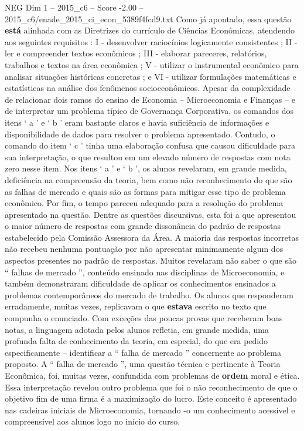 \begin{textsample}{NEG Dim 1 – 2015\_c6 – Score -2.00 – 2015\_c6/enade\_2015\_ci\_econ\_5389f4fcd9.txt}
Como já apontado, essa questão \textbf{está} alinhada com as Diretrizes do currículo de Ciências Econômicas, atendendo aos seguintes requisitos : I - desenvolver raciocínios logicamente consistentes ; II - ler e compreender textos econômicos ; III - elaborar pareceres, relatórios, trabalhos e textos na área econômica ; V - utilizar o instrumental econômico para analisar situações históricas concretas ; e VI - utilizar formulações matemáticas e estatísticas na análise dos fenômenos socioeconômicos.
Apesar da complexidade de relacionar dois ramos do ensino de Economia – Microeconomia e Finanças – e de interpretar um problema típico de Governança Corporativa, os comandos dos itens ‘ a ’ e ‘ b ’ eram bastante claros e havia suficiência de informações e disponibilidade de dados para resolver o problema apresentado.
Contudo, o comando do item ‘ c ’ tinha uma elaboração confusa que causou dificuldade para sua interpretação, o que resultou em um elevado número de respostas com nota zero nesse item.
Nos itens ‘ a ’ e ‘ b ’, os alunos revelaram, em grande medida, deficiência na compreensão da teoria, bem como não reconhecimento do que são as falhas de mercado e quais são as formas para mitigar esse tipo de problema econômico.
Por fim, o tempo pareceu adequado para a resolução do problema apresentado na questão.
Dentre as questões discursivas, esta foi a que apresentou o maior número de respostas com grande dissonância do padrão de respostas estabelecido pela Comissão Assessora da Área.
A maioria das respostas incorretas não recebeu nenhuma pontuação por não apresentar minimamente algum dos aspectos presentes no padrão de respostas.
Muitos revelaram não saber o que são “ falhas de mercado ”, conteúdo ensinado nas disciplinas de Microeconomia, e também demonstraram dificuldade de aplicar os conhecimentos ensinados a problemas contemporâneos do mercado de trabalho.
Os alunos que responderam erradamente, muitas vezes, replicavam o que \textbf{estava} escrito no texto que compunha o enunciado.
Com exceções das poucas provas que receberam boas notas, a linguagem adotada pelos alunos refletia, em grande medida, uma profunda falta de conhecimento da teoria, em especial, do que era pedido especificamente – identificar a “ falha de mercado ” concernente ao problema proposto.
A “ falha de mercado ”, uma questão técnica e pertinente à Teoria Econômica, foi, muitas vezes, confundida com problemas de \textbf{ordem} moral e ética.
Essa interpretação revelou outro problema que foi o não reconhecimento de que o objetivo fim de uma firma é a maximização do lucro.
Este conceito é apresentado nas cadeiras iniciais de Microeconomia, tornando -o um conhecimento acessível e compreensível aos alunos logo no início do curso.

\end{textsample}
